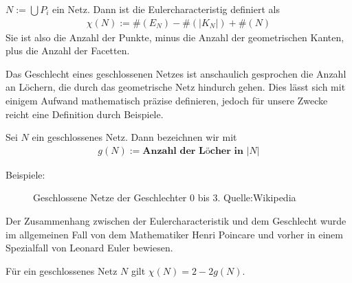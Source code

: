 \begin{Definition}
$N:= \bigcup P_i$ ein Netz. Dann ist die Eulercharacteristig definiert als
\begin{align*}
\chi(N):= \#(E_N) - \#(|K_N|) + \#(N) 
\end{align*}
Sie ist also die Anzahl der  Punkte, minus die Anzahl der geometrischen Kanten, plus die Anzahl der Facetten.
\end{Definition}

Das Geschlecht eines geschlossenen Netzes ist anschaulich gesprochen die Anzahl an Löchern, die durch das geometrische Netz hindurch gehen. Dies lässt sich mit einigem Aufwand mathematisch präzise definieren, jedoch für unsere Zwecke reicht eine Definition durch Beispiele.
\begin{Definition}
Sei $N$ ein geschlossenes Netz. Dann bezeichnen wir mit
\begin{align*}
g(N):= \textbf{Anzahl der Löcher in } |N|
\end{align*}
\end{Definition}
Beispiele:

\begin{figure}[H]\centering
    \hspace*{0.1\textwidth}
    \vspace*{1em}
    \hspace*{0.1\textwidth}
    \caption{Geschlossene Netze der Geschlechter $0$ bis $3$. Quelle:Wikipedia}
    \label{fig:closed-mesh-genders-0..3}
\end{figure}

Der Zusammenhang zwischen der Eulercharacteristik und dem Geschlecht wurde im allgemeinen Fall von dem Mathematiker  
Henri Poincare und vorher in einem Spezialfall von Leonard Euler bewiesen. 
\begin{Satz}
Für ein geschlossenes Netz $N$ gilt $\chi(N) = 2 - 2g(N)$. 
\end{Satz}

